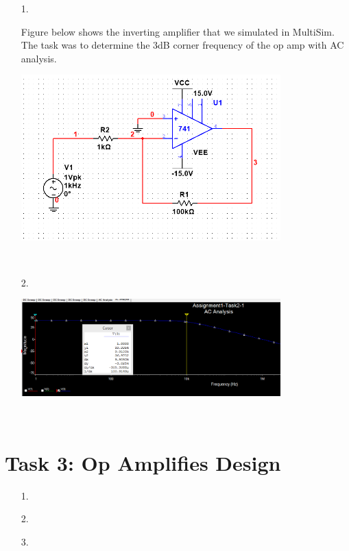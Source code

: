 \documentclass[11pt,a4paper]{article}
\begin{document}
\begin{enumerate}
  \item[1.]
  
  Figure below shows the inverting amplifier that we simulated in MultiSim. The task was to determine the 3dB corner frequency of the op amp with AC analysis.\\
  \begin{minipage}{\linewidth}
	\centering
  		\includegraphics[width=10cm]{Task2-1-Circuit}\\
    \end{minipage}\\

  \item[2.]
  
  
    \begin{minipage}{\linewidth}
	\centering
  		\includegraphics[width=10cm]{Task2-1-ACAnalysis}\\
    \end{minipage}\\
\end{enumerate}

\section*{Task 3: Op Amplifies Design}

\begin{enumerate}
  \item[1.]
  
  \item[2.]
  
  \item[3.]
  
\end{enumerate}
\end{document}
